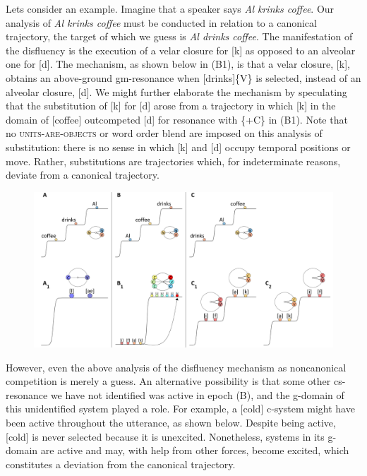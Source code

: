   Lets consider an example. Imagine that a speaker says \textit{Al krinks coffee}. Our analysis of \textit{Al krinks coffee} must be conducted in relation to a canonical trajectory, the target of which we guess is \textit{Al drinks coffee}. The manifestation of the disfluency is the execution of a velar closure for [k] as opposed to an alveolar one for [d]. The mechanism, as shown below in (B1), is that a velar closure, [k], obtains an above-ground gm-resonance when [drinks]\{V\} is selected, instead of an alveolar closure, [d]. We might further elaborate the mechanism by speculating that the substitution of [k] for [d] arose from a trajectory in which [k] in the domain of [coffee] outcompeted [d] for resonance with \{+C\} in (B1). Note that no \textsc{units}\textsc{{}-are-}\textsc{objects} or word order blend are imposed on this analysis of substitution: there is no sense in which [k] and [d] occupy temporal positions or move. Rather, substitutions are trajectories which, for indeterminate reasons, deviate from a canonical trajectory. 

  
\begin{figure}
\includegraphics[width=\textwidth]{figures/Tilsen-img58.png}
\caption{\missingcaption}
\label{fig:4:8a}
\end{figure}
 

  However, even the above analysis of the disfluency mechanism as noncanonical competition is merely a guess. An alternative possibility is that some other cs-resonance we have not identified was active in epoch (B), and the g-domain of this unidentified system played a role. For example, a [cold] c-system might have been active throughout the utterance, as shown below. Despite being active, [cold] is never selected because it is unexcited. Nonetheless, systems in its g-domain are active and may, with help from other forces, become excited, which constitutes a deviation from the canonical trajectory.

